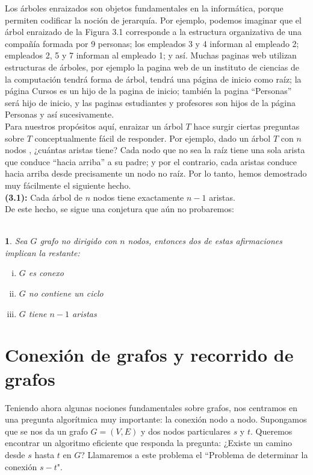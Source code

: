 \documentclass[a4paper, 12pt]{book}
\theoremstyle{dotless}
\newtheorem{theorem}{}[section]
\begin{document}
Los árboles enraizados son objetos fundamentales en la informática, porque
permiten codificar la noción de jerarquía. Por ejemplo, podemos imaginar que el árbol enraizado de la Figura 3.1 corresponde a la estructura organizativa de una compañía formada por 9 personas; los empleados 3 y 4 informan al empleado 2; empleados 2, 5 y 7 informan al empleado 1; y así.  Muchas paginas web utilizan estructuras de árboles, por ejemplo la pagina web de un instituto de ciencias de la computación tendrá forma de árbol, tendrá una página de inicio como raíz; la página Cursos es un hijo de la pagina de inicio; también la pagina ``Personas'' será hijo de inicio, y  las paginas estudiantes y profesores son hijos de la página Personas y así sucesivamente. \\

Para nuestros propósitos aquí, enraizar un árbol $T$  hace surgir ciertas preguntas sobre $T$ conceptualmente fácil de responder. Por ejemplo, dado un árbol $T$ con $n$ nodos , ¿cuántas aristas tiene? Cada nodo que no sea la raíz tiene una sola arista que conduce ``hacia arriba'' a su padre; y por el contrario, cada aristas conduce hacia arriba desde precisamente un nodo no raíz. Por lo tanto, hemos demostrado muy fácilmente el siguiente hecho. \\

\textbf{(3.1):} Cada árbol de $n$ nodos tiene exactamente $n- 1$ aristas. \\

De este hecho, se sigue una conjetura que aún no probaremos:\\
\\


\noindent\colorbox{mygray}{\parbox{\textwidth}{
\begin{theorem}
Sea $G$ grafo no dirigido con $n$ nodos, entonces dos de estas afirmaciones implican la restante:
    \begin{enumerate}[(i)]
    \itemsep0em
    \item $G$ es conexo
    \item $G$ no contiene un ciclo 
    \item $G$ tiene $n-1$ aristas
    \end{enumerate}
 \end{theorem}
 }}



\section{Conexión de grafos y recorrido de grafos}
Teniendo ahora algunas nociones fundamentales sobre grafos, nos centramos en una pregunta algorítmica muy importante: la conexión nodo a nodo. Supongamos que se nos da un grafo $G = (V,E)$ y dos nodos particulares $s$ y $t$. Queremos encontrar un algoritmo eficiente que responda la pregunta: ¿Existe un camino desde $s$ hasta $t$ en $G$? Llamaremos a este problema el ``Problema de determinar la conexión $s-t$".\\
\end{document}
